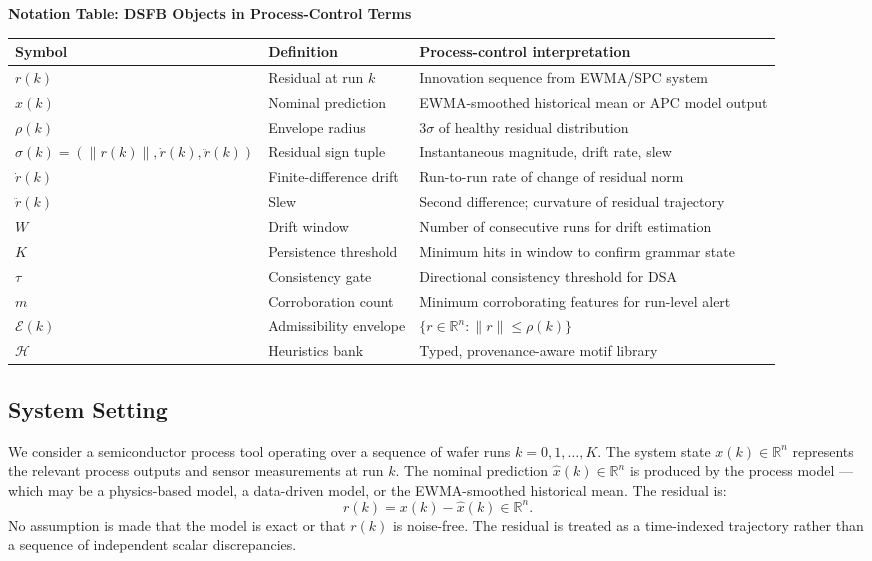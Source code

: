 \documentclass[11pt,letterpaper]{article}
\theoremstyle{scresult}
\newcommand{\R}{\mathbb{R}}
\begin{document}
\begin{center}
\small
\textbf{Notation Table: DSFB Objects in Process-Control Terms}\\ [4pt]
\renewcommand{\arraystretch}{1.3}
\begin{tabular}{@{}p{2.6cm}p{4.2cm}p{5.6cm}@{}}
\toprule
\textbf{Symbol} & \textbf{Definition} & \textbf{Process-control interpretation} \\
\midrule
$r(k)$ & Residual at run $k$ & Innovation sequence from EWMA/SPC system \\
$\hat{x}(k)$ & Nominal prediction & EWMA-smoothed historical mean or APC model output \\
$\rho(k)$ & Envelope radius & $3\sigma$ of healthy residual distribution \\
$\sigma(k) = (\|r(k)\|, \dot{r}(k), \ddot{r}(k))$ & Residual sign tuple & Instantaneous magnitude, drift rate, slew \\
$\dot{r}(k)$ & Finite-difference drift & Run-to-run rate of change of residual norm \\
$\ddot{r}(k)$ & Slew & Second difference; curvature of residual trajectory \\
$W$ & Drift window & Number of consecutive runs for drift estimation \\
$K$ & Persistence threshold & Minimum hits in window to confirm grammar state \\
$\tau$ & Consistency gate & Directional consistency threshold for DSA \\
$m$ & Corroboration count & Minimum corroborating features for run-level alert \\
$\mathcal{E}(k)$ & Admissibility envelope & $\{r \in \mathbb{R}^n : \|r\| \leq \rho(k)\}$ \\
$\mathcal{H}$ & Heuristics bank & Typed, provenance-aware motif library \\
\bottomrule
\end{tabular}
\end{center}

\subsection{System Setting}

We consider a semiconductor process tool operating over a sequence of wafer
runs $k = 0, 1, \ldots, K$. The system state $x(k) \in \R^n$ represents the
relevant process outputs and sensor measurements at run $k$. The nominal
prediction $\hat{x}(k) \in \R^n$ is produced by the process model --- which
may be a physics-based model, a data-driven model, or the EWMA-smoothed
historical mean. The residual is:
\begin{equation}
  r(k) = x(k) - \hat{x}(k) \in \R^n.
\end{equation}
No assumption is made that the model is exact or that $r(k)$ is noise-free.
The residual is treated as a time-indexed trajectory rather than a sequence
of independent scalar discrepancies.
\end{document}
